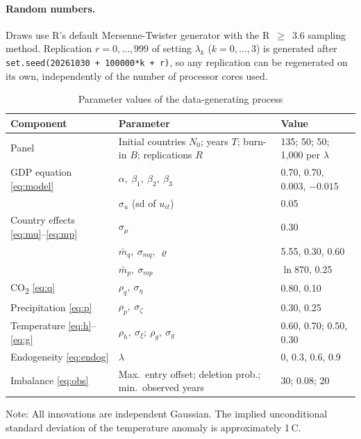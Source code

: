 \documentclass[11pt,a4paper]{article}
\newcommand{\COtwo}{CO\textsubscript{2}}
\begin{document}
\paragraph{Random numbers.} Draws use R's default Mersenne-Twister generator with the R~$\ge$~3.6 sampling method. Replication $r=0,\dots,999$ of setting $\lambda_k$ ($k=0,\dots,3$) is generated after \texttt{set.seed(20261030 + 100000*k + r)}, so any replication can be regenerated on its own, independently of the number of processor cores used.

\begin{table}[htbp]
\centering
\begin{threeparttable}
\caption{Parameter values of the data-generating process}\label{tab:design}
\small
\begin{tabular}{@{}lll@{}}
\toprule
Component & Parameter & Value \\
\midrule
Panel & Initial countries $N_0$; years $T$; burn-in $B$; replications $R$ & 135; 50; 50; 1{,}000 per $\lambda$ \\
GDP equation \eqref{eq:model} & $\alpha,\ \beta_1,\ \beta_2,\ \beta_3$ & 0.70, 0.70, 0.003, $-0.015$ \\
 & $\sigma_u$ (sd of $u_{it}$) & 0.05 \\
Country effects \eqref{eq:mu}--\eqref{eq:mp} & $\sigma_\mu$ & 0.30 \\
 & $\bar m_q,\ \sigma_{mq},\ \varrho$ & 5.55, 0.30, 0.60 \\
 & $\bar m_p,\ \sigma_{mp}$ & $\ln 870$, 0.25 \\
\COtwo{} \eqref{eq:q} & $\rho_q,\ \sigma_\eta$ & 0.80, 0.10 \\
Precipitation \eqref{eq:p} & $\rho_p,\ \sigma_\zeta$ & 0.30, 0.25 \\
Temperature \eqref{eq:h}--\eqref{eq:g} & $\rho_h,\ \sigma_\xi;\ \rho_g,\ \sigma_g$ & 0.60, 0.70; 0.50, 0.30 \\
Endogeneity \eqref{eq:endog} & $\lambda$ & 0, 0.3, 0.6, 0.9 \\
Imbalance \eqref{eq:obs} & Max.\ entry offset; deletion prob.; min.\ observed years & 30; 0.08; 20 \\
\bottomrule
\end{tabular}
\begin{tablenotes}\footnotesize
\item Note: All innovations are independent Gaussian. The implied unconditional standard deviation of the temperature anomaly is approximately 1\,\textdegree C.
\end{tablenotes}
\end{threeparttable}
\end{table}
\end{document}
